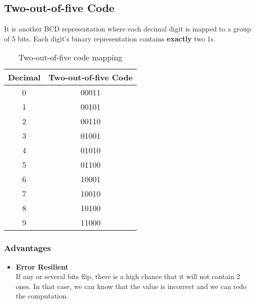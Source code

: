 \documentclass[oneside]{book}
\begin{document}
\subsection{Two-out-of-five Code}
It is another BCD representation where each decimal digit is mapped to a group of 5 bits. Each digit's binary representation contains \textbf{exactly} two 1s.
\begin{table}[ht]
	\centering
	\begin{tabular}{|cc|}
		\hline
		Decimal & Two-out-of-five Code \\
		\hline
		0       & 00011                \\
		1       & 00101                \\
		2       & 00110                \\
		3       & 01001                \\
		4       & 01010                \\
		5       & 01100                \\
		6       & 10001                \\
		7       & 10010                \\
		8       & 10100                \\
		9       & 11000                \\
		\hline
	\end{tabular}
	\caption{Two-out-of-five code mapping}
\end{table}
\subsubsection{Advantages}
\begin{itemize}
	\item \textbf{Error Resilient}\\
	      If any or several bits flip, there is a high chance that it will not contain 2 ones. In that case, we can know that the value is incorrect and we can redo the computation.
\end{itemize}
\end{document}
